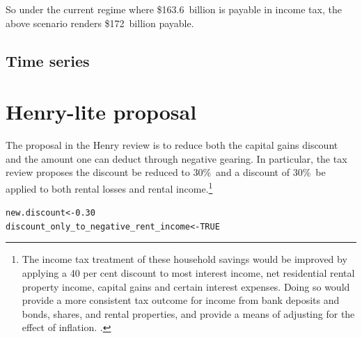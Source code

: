 \documentclass{grattan}\usepackage[]{graphicx}\usepackage[]{color}
\makeatletter
\newcommand{\hlnum}[1]{\textcolor[rgb]{0.686,0.059,0.569}{#1}}%
\newcommand{\hlstd}[1]{\textcolor[rgb]{0.345,0.345,0.345}{#1}}%
\newcommand{\hlkwb}[1]{\textcolor[rgb]{0.69,0.353,0.396}{#1}}%
\newenvironment{kframe}{%
 \def\at@end@of@kframe{}%
 \ifinner\ifhmode%
  \def\at@end@of@kframe{\end{minipage}}%
  \begin{minipage}{\columnwidth}%
 \fi\fi%
 \def\FrameCommand##1{\hskip\@totalleftmargin \hskip-\fboxsep
 \colorbox{shadecolor}{##1}\hskip-\fboxsep
     \hskip-\linewidth \hskip-\@totalleftmargin \hskip\columnwidth}%
 \MakeFramed {\advance\hsize-\width
   \@totalleftmargin\z@ \linewidth\hsize
   \@setminipage}}%
 {\par\unskip\endMakeFramed%
 \at@end@of@kframe}
\newenvironment{knitrout}{}{} %
\makeatother
\begin{document}
So under the current regime where \$163.6~billion is payable in income tax, the above scenario renders \$172~billion payable.
\clearpage


\subsection{Time series}




\onecolumn
\section{Henry-lite proposal}
The proposal in the Henry review is to reduce both the capital gains discount and the amount one can deduct through negative gearing. In particular, the tax review proposes the discount be reduced to 30\%\ and a discount of 30\%\ be applied to both rental losses and rental income.\footnote{The income tax treatment of these household savings would be improved by applying a
40 per cent discount to most interest income, net residential rental property income, capital
gains and certain interest expenses. Doing so would provide a more consistent tax
outcome for income from bank deposits and bonds, shares, and rental properties, and
provide a means of adjusting for the effect of inflation. \textcite{Treasury2010a}.}

\begin{knitrout}
\color{fgcolor}\begin{kframe}
\begin{alltt}
\hlstd{new.discount} \hlkwb{<-} \hlnum{0.30}
\hlstd{discount_only_to_negative_rent_income} \hlkwb{<-} \hlnum{TRUE}
\end{alltt}
\end{kframe}
\end{knitrout}
\end{document}
